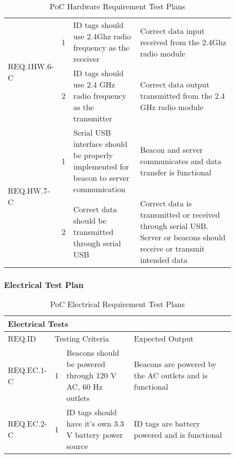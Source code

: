 \begin{table}[h!]
\begin{tabular}{|m{0.15\linewidth}|m{0.02\linewidth}|m{0.3\linewidth}|m{0.45\linewidth}|}
    \multirow{2}{*}{REQ.1HW.6-C} 
    & 1 
    & ID tags should use 2.4Ghz radio frequency as the receiver     
    & Correct data input received from the 2.4Ghz radio module          \\ 
    \cline{2-4}
    & 2 
    & ID tags should use 2.4 GHz radio frequency as the transmitter     
    & Correct data output transmitted from the 2.4 GHz radio module   \\
    \hline
    
    \multirow{2}{*}{REQ.HW.7-C} 
    & 1 
    & Serial USB interface should be properly implemented for beacon to server communication
    & Beacon and server communicates and data transfer is functional         \\ 
    \cline{2-4}
    & 2 
    & Correct data should be transmitted through serial USB     
    & Correct data is transmitted or received through serial USB. Server or beacons should receive or transmit
    intended data   \\
    \hline    

\end{tabular}
    \caption{PoC Hardware Requirement Test Plans}
\end{table}



\break
\subsubsection{Electrical Test Plan}

\begin{table}[h!]
    \centering
    
    \begin{tabular}{|m{0.15\linewidth}|m{0.02\linewidth}|m{0.3\linewidth}|m{0.45\linewidth}|} 
    \hline
    \multicolumn{4}{|l|}{Electrical Tests}      \\ 
    \hline
    REQ.ID   & \multicolumn{2}{l|}{Testing Criteria}     & Expected Output     \\ 
    \hline
    REQ.EC.1-C                  
    & 1 
    & Beacons should be powered through 120 V AC, 60 Hz outlets
    & Beacons are powered by the AC outlets and is functional   \\ 
    \hline
    REQ.EC.2-C                  
    & 1 
    & ID tags should have it's own 3.3 V battery power source
    & ID tags are battery powered and is functional  \\ 
    \hline
\end{tabular}
	\caption{PoC Electrical Requirement Test Plans}
\end{table}

